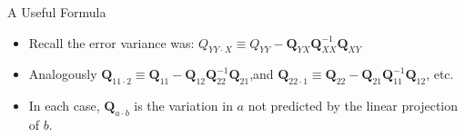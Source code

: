 \documentclass[aspectratio=169]{beamer}
\numberwithin{equation}{section}
\begin{document}
\begin{frame}{A Useful Formula}
\begin{itemize}
\item Recall the error variance was: $Q_{YY\cdot X}\equiv Q_{YY}-\bm{Q}_{YX}\bm{Q}^{-1}_{XX}\bm{Q}_{XY}$
\item Analogously $\mathbf{Q}_{11\cdot 2}\equiv \mathbf{Q}_{11}-\bm{Q}_{12}\bm{Q}^{-1}_{22}\bm{Q}_{21}$,and $\mathbf{Q}_{22\cdot 1}\equiv \mathbf{Q}_{22}-\bm{Q}_{21}\bm{Q}^{-1}_{11}\bm{Q}_{12}$, etc.
\item In each case, $\mathbf{Q}_{a\cdot b}$ is the variation in $a$ not predicted by the linear projection of $b$.
\end{itemize}
\end{frame}

%
\end{document}
